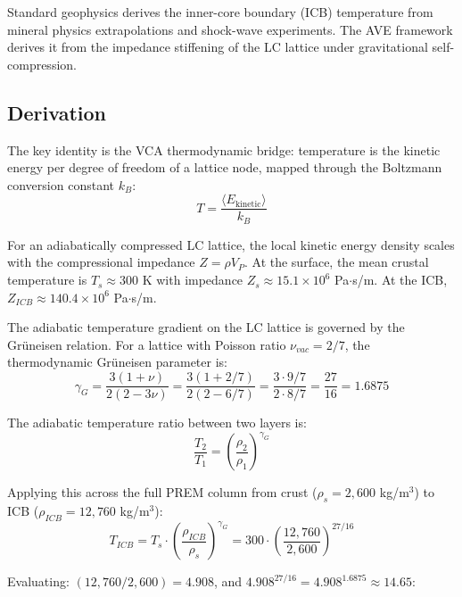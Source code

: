 Standard geophysics derives the inner-core boundary (ICB) temperature from mineral physics extrapolations and shock-wave experiments. The AVE framework derives it from the impedance stiffening of the LC lattice under gravitational self-compression.

\subsection{Derivation}

The key identity is the VCA thermodynamic bridge: temperature is the kinetic energy per degree of freedom of a lattice node, mapped through the Boltzmann conversion constant $k_B$:
\begin{equation}
    T = \frac{\langle E_{\text{kinetic}} \rangle}{k_B}
\end{equation}

For an adiabatically compressed LC lattice, the local kinetic energy density scales with the compressional impedance $Z = \rho V_P$. At the surface, the mean crustal temperature is $T_s \approx 300$ K with impedance $Z_s \approx 15.1 \times 10^6$ Pa$\cdot$s/m. At the ICB, $Z_{ICB} \approx 140.4 \times 10^6$ Pa$\cdot$s/m.

The adiabatic temperature gradient on the LC lattice is governed by the Gr\"uneisen relation. For a lattice with Poisson ratio $\nu_{vac} = 2/7$, the thermodynamic Gr\"uneisen parameter is:
\begin{equation}
    \gamma_G = \frac{3(1 + \nu)}{2(2 - 3\nu)} = \frac{3(1 + 2/7)}{2(2 - 6/7)} = \frac{3 \cdot 9/7}{2 \cdot 8/7} = \frac{27}{16} = 1.6875
    \label{eq:gruneisen}
\end{equation}

The adiabatic temperature ratio between two layers is:
\begin{equation}
    \frac{T_2}{T_1} = \left( \frac{\rho_2}{\rho_1} \right)^{\gamma_G}
\end{equation}

Applying this across the full PREM column from crust ($\rho_s = 2{,}600$ kg/m$^3$) to ICB ($\rho_{ICB} = 12{,}760$ kg/m$^3$):
\begin{equation}
    T_{ICB} = T_s \cdot \left( \frac{\rho_{ICB}}{\rho_s} \right)^{\gamma_G} = 300 \cdot \left( \frac{12{,}760}{2{,}600} \right)^{27/16}
\end{equation}

Evaluating: $(12{,}760 / 2{,}600) = 4.908$, and $4.908^{27/16} = 4.908^{1.6875} \approx 14.65$:

